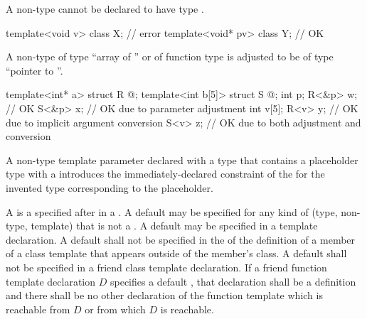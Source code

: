 \pnum
\begin{note}
A non-type
cannot be declared to have type \cv{} .
\begin{example}
\begin{codeblock}
template<void v> class X;       // error
template<void* pv> class Y;     // OK
\end{codeblock}
\end{example}
\end{note}

\pnum
A non-type
%
of type ``array of '' or
%
of function type 
is adjusted to be of type ``pointer to ''.
\begin{example}
\begin{codeblock}
template<int* a>   struct R { @\commentellip@ };
template<int b[5]> struct S { @\commentellip@ };
int p;
R<&p> w;                        // OK
S<&p> x;                        // OK due to parameter adjustment
int v[5];
R<v> y;                         // OK due to implicit argument conversion
S<v> z;                         // OK due to both adjustment and conversion
\end{codeblock}
\end{example}

\pnum
A non-type template parameter declared with a type that
contains a placeholder type with a 
introduces the immediately-declared constraint
of the 
for the invented type corresponding to the placeholder.

\pnum
A
is a
 specified after
\tcode{=}
in a
.
A default
may be specified for any kind of
(type, non-type, template)
that is not a .
A default
may be specified in a template declaration.
A default
shall not be specified in the
of the definition of a member of a class template that appears outside
of the member's class.
A default
shall not be specified in a friend class template declaration.
If a friend function template declaration $D$
specifies a default ,
that declaration shall be a definition and
there shall be no other declaration of the function template
which is reachable from $D$ or from which $D$ is reachable.

